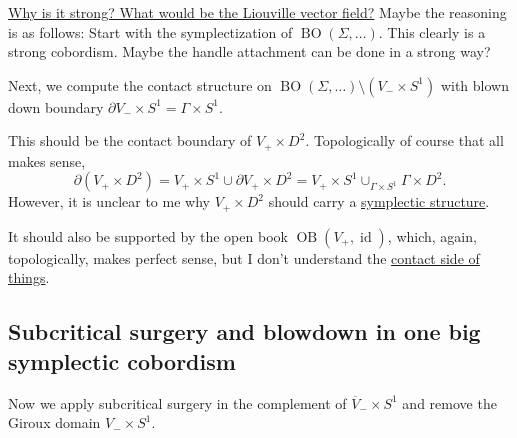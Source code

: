 \underline{Why is it strong? What would be the Liouville vector field?}
Maybe the reasoning is as follows: Start with the symplectization
of $\operatorname{BO}(\Sigma, \dots)$. This clearly is a strong cobordism.
Maybe the handle attachment can be done in a strong way?

Next, we compute the contact structure on $\operatorname{BO}(\Sigma, \dots) \setminus \left(V_- \times S^1\right)$
with blown down boundary $\partial V_- \times S^1 = \Gamma \times S^1$.

This should be the contact boundary of $V_+ \times D^2$.
Topologically of course that all makes sense,
\[
    \partial (V_+ \times D^2) = V_+ \times S^1 \cup \partial V_+ \times D^2 = V_+ \times S^1 \cup_{\Gamma \times S^1} \Gamma \times D^2.
\]
However, it is unclear to me why $V_+ \times D^2$ should carry a \underline{symplectic structure}.

It should also be supported by the open book $\operatorname{OB}(V_+, \operatorname{id})$,
which, again, topologically, makes perfect sense, but I don't understand the
\underline{contact side of things}.

\subsection*{Subcritical surgery and blowdown in one big symplectic cobordism}
Now we apply subcritical surgery in the complement of $\overline{V}_- \times S^1$ and
remove the Giroux domain $V_- \times S^1$.


